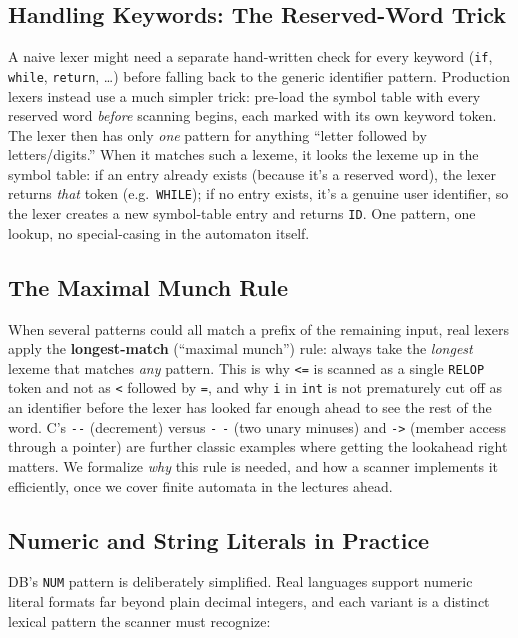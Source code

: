 \documentclass[full-course-notes.tex]{subfiles}
\begin{document}
\subsection{Handling Keywords: The Reserved-Word Trick}

A naive lexer might need a separate hand-written check for every keyword (\texttt{if},
\texttt{while}, \texttt{return}, \dots) before falling back to the generic identifier pattern.
Production lexers instead use a much simpler trick: pre-load the symbol table with every
reserved word \emph{before} scanning begins, each marked with its own keyword token. The lexer
then has only \emph{one} pattern for anything ``letter followed by letters/digits.'' When it
matches such a lexeme, it looks the lexeme up in the symbol table: if an entry already exists
(because it's a reserved word), the lexer returns \emph{that} token (e.g.\ \texttt{WHILE}); if
no entry exists, it's a genuine user identifier, so the lexer creates a new symbol-table entry
and returns \texttt{ID}. One pattern, one lookup, no special-casing in the automaton itself.

\subsection{The Maximal Munch Rule}

When several patterns could all match a prefix of the remaining input, real lexers apply the
\textbf{longest-match} (``maximal munch'') rule: always take the \emph{longest} lexeme that
matches \emph{any} pattern. This is why \texttt{<=} is scanned as a single \texttt{RELOP} token
and not as \texttt{<} followed by \texttt{=}, and why \texttt{i} in \texttt{int} is not
prematurely cut off as an identifier before the lexer has looked far enough ahead to see the
rest of the word. C's \texttt{-{}-{}} (decrement) versus \texttt{-} \texttt{-} (two unary
minuses) and \texttt{-{}>} (member access through a pointer) are further classic examples where
getting the lookahead right matters. We formalize \emph{why} this rule is needed, and how a
scanner implements it efficiently, once we cover finite automata in the lectures ahead.

\subsection{Numeric and String Literals in Practice}

DB's \texttt{NUM} pattern is deliberately simplified. Real languages support numeric literal
formats far beyond plain decimal integers, and each variant is a distinct lexical pattern the
scanner must recognize:
\end{document}
